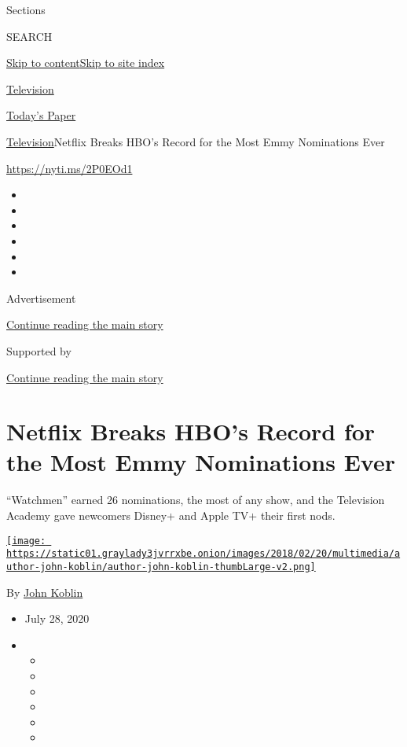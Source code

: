 Sections

SEARCH

\protect\hyperlink{site-content}{Skip to
content}\protect\hyperlink{site-index}{Skip to site index}

\href{https://www.nytimes3xbfgragh.onion/section/arts/television}{Television}

\href{https://myaccount.nytimes3xbfgragh.onion/auth/login?response_type=cookie\&client_id=vi}{}

\href{https://www.nytimes3xbfgragh.onion/section/todayspaper}{Today's
Paper}

\href{/section/arts/television}{Television}\textbar{}Netflix Breaks
HBO's Record for the Most Emmy Nominations Ever

\url{https://nyti.ms/2P0EOd1}

\begin{itemize}
\item
\item
\item
\item
\item
\item
\end{itemize}

Advertisement

\protect\hyperlink{after-top}{Continue reading the main story}

Supported by

\protect\hyperlink{after-sponsor}{Continue reading the main story}

\hypertarget{netflix-breaks-hbos-record-for-the-most-emmy-nominations-ever}{%
\section{Netflix Breaks HBO's Record for the Most Emmy Nominations
Ever}\label{netflix-breaks-hbos-record-for-the-most-emmy-nominations-ever}}

``Watchmen'' earned 26 nominations, the most of any show, and the
Television Academy gave newcomers Disney+ and Apple TV+ their first
nods.

\href{https://www.nytimes3xbfgragh.onion/by/john-koblin}{\texttt{[image: https://static01.graylady3jvrrxbe.onion/images/2018/02/20/multimedia/author-john-koblin/author-john-koblin-thumbLarge-v2.png]}}

By \href{https://www.nytimes3xbfgragh.onion/by/john-koblin}{John Koblin}

\begin{itemize}
\item
  July 28, 2020
\item
  \begin{itemize}
  \item
  \item
  \item
  \item
  \item
  \item
  \end{itemize}
\end{itemize}

